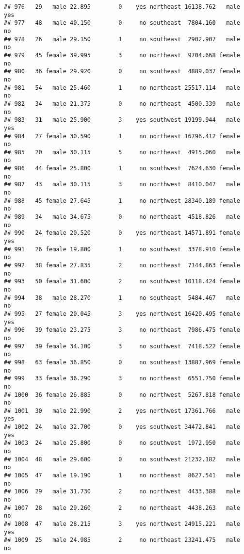 \documentclass[
]{article}
\begin{document}
\begin{verbatim}
## 976   29   male 22.895        0    yes northeast 16138.762   male      yes
## 977   48   male 40.150        0     no southeast  7804.160   male       no
## 978   26   male 29.150        1     no southeast  2902.907   male       no
## 979   45 female 39.995        3     no northeast  9704.668 female       no
## 980   36 female 29.920        0     no southeast  4889.037 female       no
## 981   54   male 25.460        1     no northeast 25517.114   male       no
## 982   34   male 21.375        0     no northeast  4500.339   male       no
## 983   31   male 25.900        3    yes southwest 19199.944   male      yes
## 984   27 female 30.590        1     no northeast 16796.412 female       no
## 985   20   male 30.115        5     no northeast  4915.060   male       no
## 986   44 female 25.800        1     no southwest  7624.630 female       no
## 987   43   male 30.115        3     no northwest  8410.047   male       no
## 988   45 female 27.645        1     no northwest 28340.189 female       no
## 989   34   male 34.675        0     no northeast  4518.826   male       no
## 990   24 female 20.520        0    yes northeast 14571.891 female      yes
## 991   26 female 19.800        1     no southwest  3378.910 female       no
## 992   38 female 27.835        2     no northeast  7144.863 female       no
## 993   50 female 31.600        2     no southwest 10118.424 female       no
## 994   38   male 28.270        1     no southeast  5484.467   male       no
## 995   27 female 20.045        3    yes northwest 16420.495 female      yes
## 996   39 female 23.275        3     no northeast  7986.475 female       no
## 997   39 female 34.100        3     no southwest  7418.522 female       no
## 998   63 female 36.850        0     no southeast 13887.969 female       no
## 999   33 female 36.290        3     no northeast  6551.750 female       no
## 1000  36 female 26.885        0     no northwest  5267.818 female       no
## 1001  30   male 22.990        2    yes northwest 17361.766   male      yes
## 1002  24   male 32.700        0    yes southwest 34472.841   male      yes
## 1003  24   male 25.800        0     no southwest  1972.950   male       no
## 1004  48   male 29.600        0     no southwest 21232.182   male       no
## 1005  47   male 19.190        1     no northeast  8627.541   male       no
## 1006  29   male 31.730        2     no northwest  4433.388   male       no
## 1007  28   male 29.260        2     no northeast  4438.263   male       no
## 1008  47   male 28.215        3    yes northwest 24915.221   male      yes
## 1009  25   male 24.985        2     no northeast 23241.475   male       no

\end{verbatim}
\end{document}
